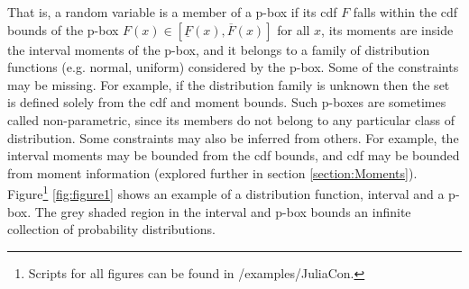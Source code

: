 \documentclass{juliacon}
\begin{document}
\noindent That is, a random variable is a member of a p-box if its cdf $F$ falls within the cdf bounds of the p-box $F(x) \in [\underline{F}(x), \overline{F}(x)]$ for all $x$, its moments are inside the interval moments of the p-box, and it belongs to a family of distribution functions (e.g. normal, uniform) considered by the p-box. Some of the constraints may be missing. For example, if the distribution family is unknown then the set is defined solely from the cdf and moment bounds. Such p-boxes are sometimes called non-parametric, since its members do not belong to any particular class of distribution. Some constraints may also be inferred from others. For example, the interval moments may be bounded from the cdf bounds, and cdf may be bounded from moment information (explored further in section \ref{section:Moments}). Figure\footnote{Scripts for all figures can be found in /examples/JuliaCon.} \ref{fig:figure1} shows an example of a distribution function, interval and a p-box. The grey shaded region in the interval and p-box bounds an infinite collection of probability distributions.
\end{document}
